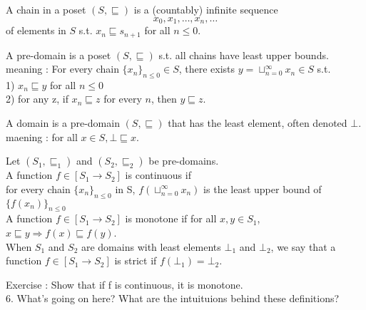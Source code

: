 \documentclass{report}[12pt]
\begin{document}
\begin{definition}
    A chain in a poset $(S, \sqsubseteq)$ is a (countably) infinite sequence
    \[x_0, x_1, \ldots, x_n, \ldots\]
    of elements in $S$ s.t. $x_n \sqsubseteq s_{n+1}$ for all $n \le 0$.
\end{definition}
\begin{definition}
    A pre-domain is a poset $(S, \sqsubseteq)$ s.t. all chains have least upper bounds. \\
    meaning : For every chain $\{x_n\}_{n\le 0} \in S$, there exists $y=\sqcup_{n=0}^\infty x_n \in S$ s.t. \\
    1) $x_n \sqsubseteq y$ for all $n \le 0$ \\
    2) for any z, if $x_n \sqsubseteq z$ for every $n$, then $y \sqsubseteq z$.
\end{definition}
\begin{definition}
    A domain is a pre-domain $(S, \sqsubseteq)$ that has the least element, often denoted $\bot$. \\
    maening : for all $x \in S, \bot \sqsubseteq x$.
\end{definition}
\begin{definition}
    Let $(S_1, \sqsubseteq_1)$ and $(S_2, \sqsubseteq_2)$ be pre-domains. \\
    A function $f\in [S_1 \rightarrow S_2]$ is continuous if \\
    for every chain $\{x_n\}_{n\le 0}$ in S, $f(\sqcup_{n=0}^\infty x_n)$ is the least upper bound of $\{f(x_n)\}_{n\le 0}$\\
    A function $f \in [S_1 \rightarrow S_2]$ is monotone if for all $x, y \in S_1$, $x\sqsubseteq y \Rightarrow f(x) \sqsubseteq f(y)$. \\
    When $S_1$ and $S_2$ are domains with least elements $\bot_1$ and $\bot_2$, we say that a function $f\in [S_1 \rightarrow S_2]$ is strict if $f(\bot_1) = \bot_2$.
\end{definition}
Exercise : Show that if f is continuous, it is monotone. \\
6. What's going on here? What are the intuituions behind these definitions?
\end{document}
